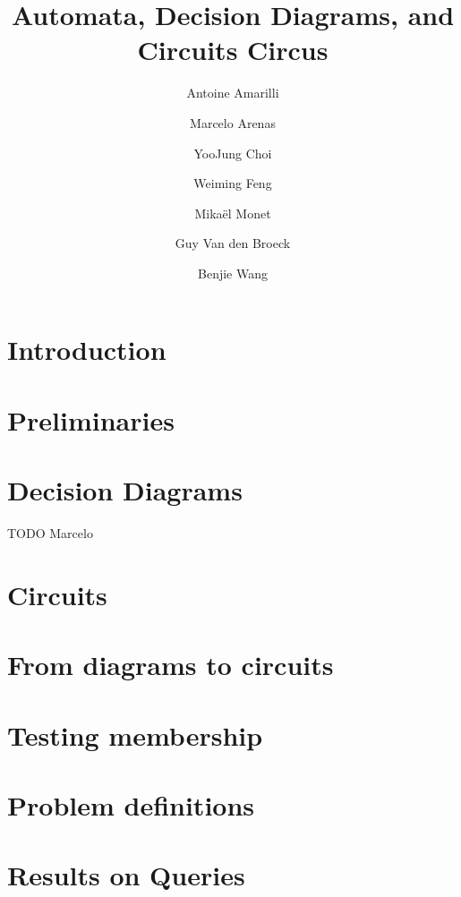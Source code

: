 \documentclass[letterpaper,11pt]{article}
\begin{document}
\title{Automata, Decision Diagrams, and Circuits Circus}

\author{Antoine Amarilli \and Marcelo Arenas \and YooJung Choi \and Weiming Feng \and Mikaël Monet \and Guy Van den Broeck \and Benjie Wang}

\date{}
\maketitle

\tableofcontents

\section{Introduction} \label{sec:intro}


\section{Preliminaries} \label{sec:prelims}


\section{Decision Diagrams} \label{sec:diagrams}
TODO Marcelo



\section{Circuits} \label{sec:circuits}


\section{From diagrams to circuits} \label{sec:diag_circ}


\section{Testing membership} \label{sec:member}


\section{Problem definitions} \label{sec:problems}


\section{Results on Queries} \label{sec:res_query}

\end{document}
